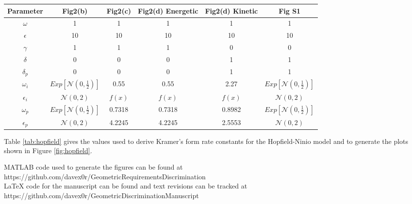 \begin{table*}[hptb]
\begin{center}
\begin{tabular}{|c|c|c|c|c|c|}
\hline
Parameter & Fig2(b) & Fig2(c)& Fig2(d) Energetic&Fig2(d) Kinetic&Fig S1\\
\hline
$\omega$&1&1&1&1&1\\
$\epsilon$&10&10&10&10&10\\
$\gamma$&1&1&1&0&0\\
$\delta$&0&0&0&1&1\\
$\delta_p$&0&0&0&1&1\\
$\omega_i$&$Exp[\mathcal{N}(0,\frac{1}{2})]$&0.55&0.55&2.27&$Exp[\mathcal{N}(0,\frac{1}{2})]$\\
$\epsilon_i$&$\mathcal{N}(0,2)$&$f(x)$&$f(x)$&$f(x)$&$\mathcal{N}(0,2)$\\
$\omega_p$&$Exp[\mathcal{N}(0,\frac{1}{2})]$&0.7318&0.7318&0.8982&$Exp[\mathcal{N}(0,\frac{1}{2})]$\\
$\epsilon_p$&$\mathcal{N}(0,2)$&4.2245&4.2245&2.5553&$\mathcal{N}(0,2)$\\
\hline
\end{tabular}
\end{center}
\caption{Parameters used to generate different figures for the Hopfield-Ninio Model.  $f(x)$ indicate that this parameter was used as a dependent variable for plotting.  \label{tab:hopfield}}
\end{table*}%
Table \ref{tab:hopfield} gives the values used to derive Kramer's form rate constants for the Hopfield-Ninio model and to generate the plots shown in Figure \ref{fig:hopfield}.

\begin{widetext} 
\noindent MATLAB code used to generate the figures can be found at\\https://github.com/davex0r/GeometricRequirementsDiscrimination\\
LaTeX code for the manuscript can be found and text revisions can be tracked at\\https://github.com/davex0r/GeometricDiscriminationManuscript \end{widetext} 


